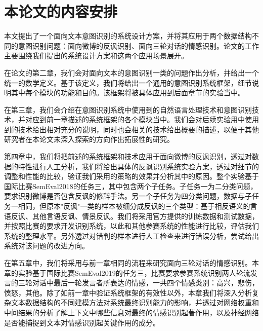 \section{本论文的内容安排}

本文提出了一个面向文本意图识别的系统设计方案，并将其应用于两个数据结构不同的意图识别问题：面向微博的反讽识别、面向三轮对话的情感识别。论文的工作主要围绕我们提出的系统设计方案和这两个应用场景展开。

在论文的第二章，我们会对面向文本的意图识别一类的问题作出分析，并给出一个统一的数学定义。基于该定义，我们将给出一个通用的意图识别系统框架，细节说明其中每个模块的功能和目的。该框架将被具体应用到后面章节的实验当中。

在第三章，我们会介绍在意图识别系统中使用到的自然语言处理技术和意图识别技术，并对应到前一章描述的系统框架的各个模块当中。我们会对后续实验用中使用到的技术给出相对充分的说明，同时也会相关的技术给出概要的描述，以便于其他研究者在本论文未深入探索的方向作出拓展性的研究。

第四章中，我们将把前述的系统框架和技术应用于面向微博的反讽识别，透过对数据的特性进行人工分析，我们将给出具体的反讽识别系统实验方案，透过对细节的调整和性能的比较，验证我们采用的策略的效果并分析其中的原因。整个实验基于国际比赛SemEval2018的任务三\cite{van2018semeval}，其中包含两个子任务。子任务一为二分类问题，要求识别微博是否包含反讽的修辞手法。另一个子任务为四分类问题，数据与子任务一相同，但原本"反讽"一类的样本被细分成反讽的三个类型：基于相反语义的言语反讽、其他言语反讽、情景反讽。我们将采用官方提供的训练数据和测试数据，并按照比赛的要求开发识别系统，以此和其他参赛系统的性能进行比较，评估我们系统的整理水平。另外透过对错判的样本进行人工检查来进行错误分析，尝试给出系统对该问题的改进方向。

在第五章中，我们将采用与前一章相同的流程来研究面向三轮对话的情感识别。本章的实验基于国际比赛SemEval2019的任务三\cite{SemEval2019Task3}，比赛要求参赛系统识别两人轮流发言的三轮对话中最后一轮发言者所表达的情感，一共四个情感类别：高兴，悲伤，愤怒，其他。除了如前一章中验证系统框架的有效性以外，本章我们将深入分析复杂文本数据结构的不同建模方法对系统最终识别能力的影响，并透过对网络权重和中间结果的分析了解上下文中哪些信息对最终的情感识别起著作用，以及神经网络是否能捕捉到文本对情感识别起关键作用的成分。



















